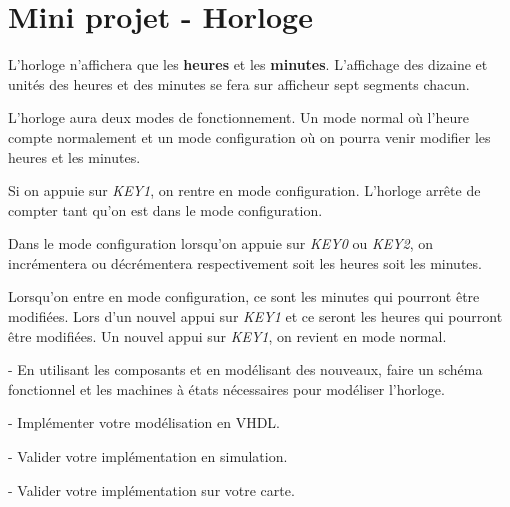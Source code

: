 \section{Mini projet - Horloge}

L'horloge n'affichera que les \textbf{heures} et les \textbf{minutes}. L'affichage des dizaine et unités des heures et des minutes se fera sur afficheur sept segments chacun.

\medskip

L'horloge aura deux modes de fonctionnement. Un mode normal où l'heure compte normalement et un mode configuration où on pourra venir modifier les heures et les minutes.

\medskip
Si on appuie sur \textit{KEY1}, on rentre en mode configuration. L'horloge arrête de compter tant qu'on est dans le mode configuration.

\medskip

Dans le mode configuration lorsqu'on appuie sur \textit{KEY0} ou \textit{KEY2}, on incrémentera ou décrémentera respectivement soit les heures soit les minutes.

\medskip

Lorsqu'on entre en mode configuration, ce sont les minutes qui pourront être modifiées. Lors d'un nouvel appui sur \textit{KEY1} et ce seront les heures qui pourront être modifiées. Un nouvel appui sur \textit{KEY1}, on revient en mode normal.

\medskip

- En utilisant les composants et en modélisant des nouveaux, faire un schéma fonctionnel et les machines à états nécessaires pour modéliser l'horloge.

\medskip

- Implémenter votre modélisation en VHDL.

\medskip

- Valider votre implémentation en simulation.

\medskip

- Valider votre implémentation sur votre carte.
